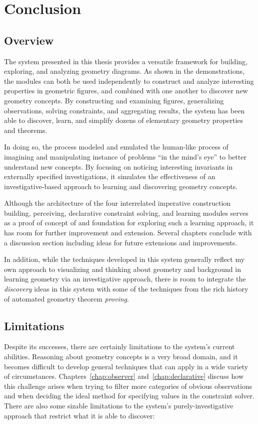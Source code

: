 \chapter{Conclusion}
\label{chap:conclusion}

\section{Overview}

The system presented in this thesis provides a versatile framework for
building, exploring, and analyzing geometry diagrams. As shown in the
demonstrations, the modules can both be used independently to
construct and analyze interesting properties in geometric figures, and
combined with one another to discover new geometry concepts. By
constructing and examining figures, generalizing observations, solving
constraints, and aggregating results, the system has been able to
discover, learn, and simplify dozens of elementary geometry properties
and theorems.

In doing so, the process modeled and emulated the human-like process
of imagining and manipulating instance of problems ``in the mind's
eye'' to better understand new concepts. By focusing on noticing
interesting invariants in externally specified investigations, it
simulates the effectiveness of an investigative-based approach to
learning and discovering geometry concepts.

Although the architecture of the four interrelated imperative
construction building, perceiving, declarative constraint solving, and
learning modules serves as a proof of concept of and foundation for
exploring such a learning approach, it has room for further
improvement and extension. Several chapters conclude with a discussion
section including ideas for future extensions and improvements.

In addition, while the techniques developed in this system generally
reflect my own approach to visualizing and thinking about geometry and
background in learning geometry via an investigative approach, there
is room to integrate the \emph{discovery} ideas in this system with
some of the techniques from the rich history of automated geometry
theorem \emph{proving}.

\section{Limitations}

Despite its successes, there are certainly limitations to the system's
current abilities. Reasoning about geometry concepts is a very broad
domain, and it becomes difficult to develop general techniques that
can apply in a wide variety of circumstances.
Chapters~\ref{chap:observer} and~\ref{chap:declarative} discuss how
this challenge arises when trying to filter more categories of obvious
observations and when deciding the ideal method for specifying values
in the constraint solver.  There are also some sizable limitations to
the system's purely-investigative approach that restrict what it is
able to discover:

